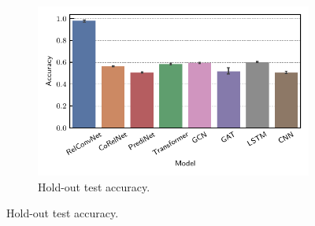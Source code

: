 \begin{figure}[ht]
    \vskip-10pt
    \centering
    \begin{subfigure}[b]{0.5\textwidth}
        \centering
        \includegraphics[width=\textwidth]{figs/experiments/contains_set_acc.pdf}
        \vskip-5pt
        \caption{\footnotesize{Hold-out test accuracy.}}\label{fig:contains_set_acc_notuning}
    \end{subfigure}


\end{figure}
